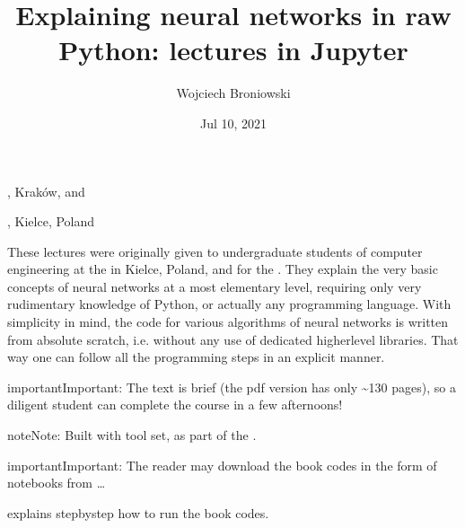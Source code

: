 \documentclass[letterpaper,10pt,english]{jupyterBook}
\title{Explaining neural networks in raw Python: lectures in Jupyter}
\date{Jul 10, 2021}
\author{Wojciech Broniowski}
\begin{document}
\pagestyle{empty}
\sphinxmaketitle
\pagestyle{plain}
\sphinxtableofcontents
\pagestyle{normal}
\label{\detokenize{docs/index::doc}}


\sphinxAtStartPar
{}

\sphinxAtStartPar
{}, Kraków, and

\sphinxAtStartPar
{}, Kielce, Poland

\sphinxAtStartPar
These lectures were originally given to undergraduate students of computer engineering at the  in Kielce, Poland, and for
the . They explain the very basic concepts of neural networks at a most elementary level, requiring only very rudimentary knowledge of Python, or actually any programming language. With simplicity in mind, the code for various algorithms of neural networks is written from absolute scratch, i.e. without any use of dedicated higher\sphinxhyphen{}level libraries. That way one can follow all the programming steps in an explicit manner.

\begin{sphinxadmonition}{important}{Important:}
\sphinxAtStartPar
The text is brief (the pdf version has only \textasciitilde{}130 pages), so a diligent student can complete the course in a few afternoons!
\end{sphinxadmonition}

\begin{sphinxadmonition}{note}{Note:}
\sphinxAtStartPar
Built with  tool set, as part of the
.
\end{sphinxadmonition}

\begin{sphinxadmonition}{important}{Important:}
\sphinxAtStartPar
The reader may download the book codes in the form of
 notebooks from …

\sphinxAtStartPar
{\hyperref[\detokenize{docs/appendix:app-run}]{}} explains step\sphinxhyphen{}by\sphinxhyphen{}step how to run the book codes.
\end{sphinxadmonition}
\end{document}

